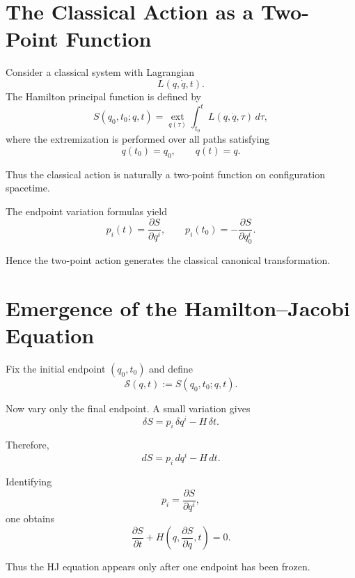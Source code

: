 \documentclass[11pt]{article}
\begin{document}
\section{The Classical Action as a Two-Point Function}

Consider a classical system with Lagrangian
\[
L(q,\dot q,t).
\]
The Hamilton principal function is defined by
\begin{equation}
S(q_0,t_0;q,t)
=
\operatorname*{ext}_{q(\tau)}
\int_{t_0}^{t} L(q,\dot q,\tau)\,d\tau,
\label{principal}
\end{equation}
where the extremization is performed over all paths satisfying
\[
q(t_0)=q_0,
\qquad
q(t)=q.
\]

Thus the classical action is naturally a two-point function on configuration spacetime.

The endpoint variation formulas yield
\begin{equation}
p_i(t)=\frac{\partial S}{\partial q^i},
\qquad
p_i(t_0)=-\frac{\partial S}{\partial q_0^i}.
\label{endpoint}
\end{equation}

Hence the two-point action generates the classical canonical transformation.

\section{Emergence of the Hamilton--Jacobi Equation}

Fix the initial endpoint $(q_0,t_0)$ and define
\begin{equation}
\mathcal S(q,t)
:=
S(q_0,t_0;q,t).
\end{equation}

Now vary only the final endpoint. A small variation gives
\begin{equation}
\delta S
=
p_i\,\delta q^i - H\,\delta t.
\end{equation}

Therefore,
\begin{equation}
dS = p_i\,dq^i - H\,dt.
\end{equation}

Identifying
\[
p_i=\frac{\partial S}{\partial q^i},
\]
one obtains
\begin{equation}
\frac{\partial S}{\partial t}
+
H\left(q,\frac{\partial S}{\partial q},t\right)
=
0.
\end{equation}

Thus the HJ equation appears only after one endpoint has been frozen.
\end{document}
